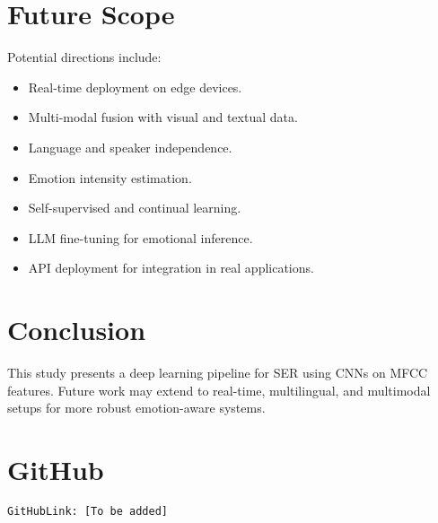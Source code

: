 \documentclass[10pt,twocolumn,letterpaper]{article}
\begin{document}
\section{Future Scope}
Potential directions include:
\begin{itemize}
  \item Real-time deployment on edge devices.
  \item Multi-modal fusion with visual and textual data.
  \item Language and speaker independence.
  \item Emotion intensity estimation.
  \item Self-supervised and continual learning.
  \item LLM fine-tuning for emotional inference.
  \item API deployment for integration in real applications.
\end{itemize}

\section{Conclusion}
This study presents a deep learning pipeline for SER using CNNs on MFCC features. Future work may extend to real-time, multilingual, and multimodal setups for more robust emotion-aware systems.

\section*{GitHub}
\noindent \texttt{GitHubLink: [To be added]}
\end{document}
